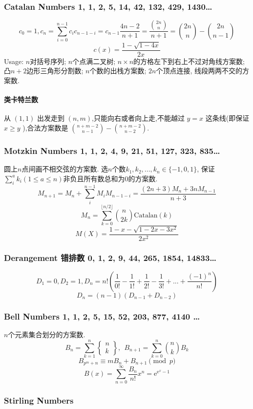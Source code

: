 \subsubsection{Catalan Numbers 1, 1, 2, 5, 14, 42, 132, 429, 1430\dots}
\[c_{0}=1,c_n=\sum_{i=0}^{n-1}c_ic_{n-1-i}=c_{n-1}\frac{4n-2}{n+1}=\frac{\binom{2n}{n}}{n+1}=\binom{2n}{n}-\binom{2n}{n-1}\]
\[ c(x)=\frac{1-\sqrt{1-4x}}{2x}\]
Usage: $n$对括号序列; $n$个点满二叉树; $n\times n$的方格左下到右上不过对角线方案数; 凸$n+2$边形三角形分割数; $n$个数的出栈方案数; $2n$个顶点连接, 线段两两不交的方案数.
\paragraph*{类卡特兰数}
从 $(1,1)$ 出发走到 $(n,m)$,只能向右或者向上走,不能越过 $y=x$ 这条线(即保证 $x\geq y$ ),合法方案数是 $\binom{n+m-2}{n-1} - \binom{n+m-2}{n-2}$.
\subsubsection{Motzkin Numbers 1, 1, 2, 4, 9, 21, 51, 127, 323, 835\dots}
圆上$n$点间画不相交弦的方案数. 选$n$个数$k_1,k_2,...,k_n\in\{-1,0,1\}$, 保证$\sum_i^ak_i(1\leq a\leq n)$非负且所有数总和为$0$的方案数. \[M_{n+1}=M_n+\sum_i^{n-1}M_iM_{n-1-i}=\frac{(2n+3)M_n+3nM_{n-1}}{n+3}\]
\[M_n=\sum_{k=0}^{\lfloor n/2 \rfloor}\binom{n}{2k} \mathrm{Catalan}(k)\]
\[M(X)=\frac{1-x-\sqrt{1-2x-3x^2}}{2x^2}\]
\subsubsection{Derangement 错排数 0, 1, 2, 9, 44, 265, 1854, 14833\dots}
\[D_1=0,D_2=1,D_n=n!\left(\frac{1}{0!}-\frac{1}{1!}+\frac{1}{2!}-\frac{1}{3!}+...+\frac{(-1)^n}{n!}\right)\]
\[D_n=(n-1)(D_{n-1}+D_{n-2})\]
\subsubsection{Bell Numbers 1, 1, 2, 5, 15, 52, 203, 877, 4140 \dots}
$n$个元素集合划分的方案数.
\[ B_n=\sum_{k=1}^{n}\begin{Bmatrix} n \\ k \end{Bmatrix},\ \ B_{n+1} = \sum_{k=0}^n\binom{n}{k}B_k \]
\[ B_{p^m+n} \equiv mB_n+B_{n+1} \pmod{p} \]
\[B(x)=\sum_{n=0}^{\infty}\frac{B_n}{n!}x^n=\mathrm{e}^{\mathrm{e}^x-1}\]
\subsubsection{Stirling Numbers}
